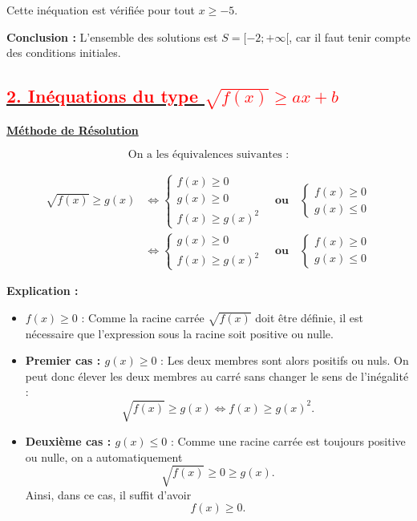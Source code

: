 \documentclass[12pt,a4paper]{article}
\newcounter{solution}
\begin{document}
Cette inéquation est vérifiée pour tout \( x \geq -5 \).

\textbf{Conclusion :} L'ensemble des solutions est \( S = [-2; +\infty[ \), car il faut tenir compte des conditions initiales.

\subsection*{\underline{\textbf{\textcolor{red}{2. Inéquations du type \( \sqrt{f(x)} \geq ax+b \) }}}}

\underline{\textbf{Méthode de Résolution}}

\[
\text{On a les équivalences suivantes :}
\]

\[
\begin{aligned}
\sqrt{f(x)} \geq g(x)
&\Leftrightarrow
\begin{cases}
f(x) \geq 0\\
g(x) \geq 0\\
f(x) \geq g(x)^2
\end{cases}
\quad \textbf{ou} \quad
\begin{cases}
f(x) \geq 0\\
g(x) \leq 0
\end{cases}\\
&\Leftrightarrow
\boxed{
\begin{cases}
g(x) \geq 0\\
f(x) \geq g(x)^2
\end{cases}
\quad \textbf{ou} \quad
\begin{cases}
f(x) \geq 0\\
g(x) \leq 0
\end{cases}}
\end{aligned}
\]

\textbf{Explication :}

\begin{itemize}
    \item \textbf{\( f(x) \geq 0 \)} : Comme la racine carrée
    \( \sqrt{f(x)} \) doit être définie, il est nécessaire que
    l'expression sous la racine soit positive ou nulle.

    \item \textbf{Premier cas : \( g(x) \geq 0 \)} :
    Les deux membres sont alors positifs ou nuls. On peut donc
    élever les deux membres au carré sans changer le sens de
    l'inégalité :
    \[
    \sqrt{f(x)} \geq g(x)
    \Leftrightarrow
    f(x) \geq g(x)^2.
    \]

    \item \textbf{Deuxième cas : \( g(x) \leq 0 \)} :
    Comme une racine carrée est toujours positive ou nulle, on a
    automatiquement
    \[
    \sqrt{f(x)} \geq 0 \geq g(x).
    \]
    Ainsi, dans ce cas, il suffit d'avoir
    \[
    f(x) \geq 0.
    \]
\end{itemize}
\end{document}
